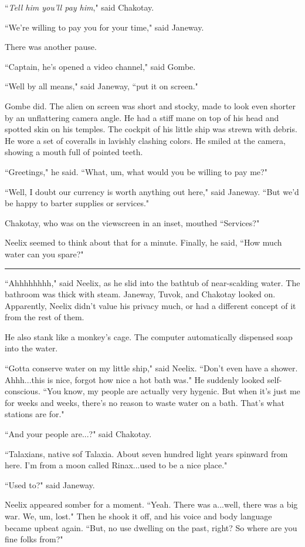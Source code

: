 \documentclass[twoside,letterpaper,12pt]{memoir}
\begin{document}
``\textit{Tell him you'll pay him}," said Chakotay.

``We're willing to pay you for your time," said Janeway.

There was another pause.

``Captain, he's opened a video channel," said Gombe.

``Well by all means," said Janeway, ``put it on screen."

Gombe did. The alien on screen was short and stocky, made to look even shorter by an unflattering camera angle. He had a stiff mane on top of his head and spotted skin on his temples. The cockpit of his little ship was strewn with debris. He wore a set of coveralls in lavishly clashing colors. He smiled at the camera, showing a mouth full of pointed teeth.

``Greetings," he said. ``What, um, what would you be willing to pay me?"

``Well, I doubt our currency is worth anything out here," said Janeway. ``But we'd be happy to barter supplies or services."

Chakotay, who was on the viewscreen in an inset, mouthed ``Services?"

Neelix seemed to think about that for a minute. Finally, he said, ``How much water can you spare?"

\fancybreak{\rule{3cm}{0.4 pt}}
``Ahhhhhhhh," said Neelix, as he slid into the bathtub of near-scalding water. The bathroom was thick with steam. Janeway, Tuvok, and Chakotay looked on. Apparently, Neelix didn't value his privacy much, or had a different concept of it from the rest of them.

He also stank like a monkey's cage. The computer automatically dispensed soap into the water.

``Gotta conserve water on my little ship," said Neelix. ``Don't even have a shower. Ahhh...this is nice, forgot how nice a hot bath was." He suddenly looked self-conscious. ``You know, my people are actually very hygenic. But when it's just me for weeks and weeks, there's no reason to waste water on a bath. That's what stations are for."

``And your people are...?" said Chakotay.

``Talaxians, native sof Talaxia. About seven hundred light years spinward from here. I'm from a moon called Rinax...used to be a nice place."

``Used to?" said Janeway.

Neelix appeared somber for a moment. ``Yeah. There was a...well, there was a big war. We, um, lost." Then he shook it off, and his voice and body language became upbeat again. ``But, no use dwelling on the past, right? So where are you fine folks from?"
\end{document}
